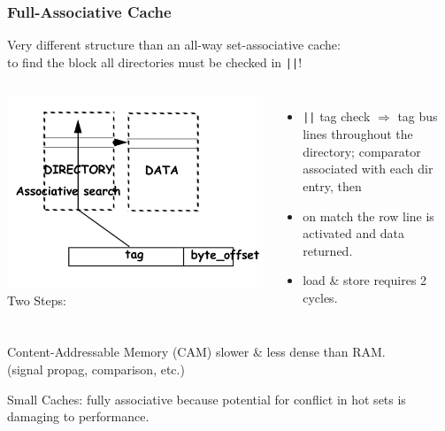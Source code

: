 \documentclass{beamer}
\renewcommand{\emph}[1]{\textcolor{structure}{#1}}
\newcommand{\emp}[1]{\textcolor{DikuRed}{ #1}}
\begin{document}
\begin{frame}[fragile,t]
\frametitle{Full-Associative Cache}
 
Very different structure than an all-way set-associative cache:\\
to find the block all directories must be checked in {\tt ||}!

\begin{columns}
\includegraphics[width=33ex]{Figures/FigsMemH/FullAssoc}\pause
{}
Two Steps:
\begin{itemize}
    \item \emp{{\tt||} tag check} $\Rightarrow$ tag bus lines throughout the directory; 
            comparator associated with each dir entry, then
    \item  \emph{on match} the row line is activated and data returned.
    \item \emp{load \& store requires 2 cycles.}
\end  {itemize} 
\end{columns}
\medskip

Content-Addressable Memory (CAM) \emp{slower \& less dense} than RAM.\\
(signal propag, comparison, etc.)\bigskip

Small Caches: fully associative because potential for conflict in hot sets
    is damaging to performance. 

\end{frame}
\end{document}
